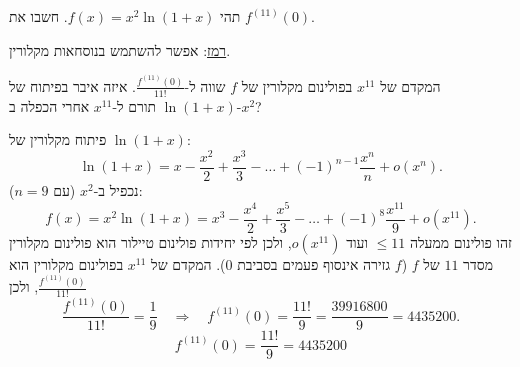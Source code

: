 
\begin{question}
תהי $f(x)=x^2\ln(1+x)$. חשבו את $f^{(11)}(0)$.

\underline{רמז}: אפשר להשתמש בנוסחאות מקלורין.
\end{question}

\begin{hint}
המקדם של $x^{11}$ בפולינום מקלורין של $f$ שווה ל-$\frac{f^{(11)}(0)}{11!}$. איזה איבר בפיתוח של $\ln(1+x)$ תורם ל-$x^{11}$ אחרי הכפלה ב-$x^2$?
\end{hint}

\begin{solution}
פיתוח מקלורין של $\ln(1+x)$:
\[ \ln(1+x)=x-\frac{x^2}{2}+\frac{x^3}{3}-\dots+(-1)^{n-1}\frac{x^n}{n}+o(x^n). \]
נכפיל ב-$x^2$ (עם $n=9$):
\[ f(x)=x^2\ln(1+x)=x^3-\frac{x^4}{2}+\frac{x^5}{3}-\dots+(-1)^{8}\frac{x^{11}}{9}+o(x^{11}). \]
זהו פולינום ממעלה $\le 11$ ועוד $o(x^{11})$, ולכן לפי יחידות פולינום טיילור הוא פולינום מקלורין מסדר $11$ של $f$ ($f$ גזירה אינסוף פעמים בסביבת $0$). המקדם של $x^{11}$ בפולינום מקלורין הוא $\frac{f^{(11)}(0)}{11!}$, ולכן
\[ \frac{f^{(11)}(0)}{11!}=\frac19\quad\Longrightarrow\quad f^{(11)}(0)=\frac{11!}{9}=\frac{39916800}{9}=4435200. \]
\[ \boxed{f^{(11)}(0)=\frac{11!}{9}=4435200} \]
\end{solution}
